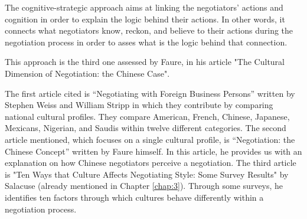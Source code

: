 \documentclass[../main.tex]{subfiles}
\begin{document}
The cognitive-strategic approach aims at linking the negotiators' actions and cognition in order to explain the logic behind their actions. In other words, it connects what negotiators know, reckon, and believe to their actions during the negotiation process in order to asses what is the logic behind that connection.

This approach is the third one assessed by Faure, in his article "The Cultural Dimension of Negotiation: the Chinese Case".

The first article cited is “Negotiating with Foreign Business Persons” written by Stephen Weiss and William Stripp in which they contribute by comparing national cultural profiles. They compare American, French, Chinese, Japanese, Mexicans, Nigerian, and Saudis within twelve different categories.
The second article mentioned, which focuses on a single cultural profile, is “Negotiation: the Chinese Concept” written by Faure himself. In this article, he provides us with an explanation on how Chinese negotiators perceive a negotiation.
The third article is "Ten Ways that Culture Affects Negotiating Style: Some Survey Results" by Salacuse (already mentioned in Chapter \ref{chap:3}). Through some surveys, he identifies ten factors through which cultures behave differently within a negotiation process. \\
\end{document}
